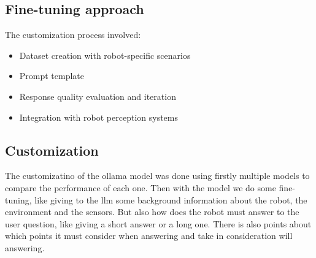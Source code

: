 \subsection{Fine-tuning approach}

The customization process involved:
\begin{itemize}
    \item Dataset creation with robot-specific scenarios
    \item Prompt template
    \item Response quality evaluation and iteration
    \item Integration with robot perception systems
\end{itemize}

\subsection{Customization}
The customizatino of the ollama model was done using firstly multiple models to compare the performance of each one.
Then with the model we do some fine-tuning, like giving to the llm some background information about the robot, the environment and the sensors.
But also how does the robot must answer to the user question, like giving a short answer or a long one.
There is also points about which points it must consider when answering and take in consideration will answering.
